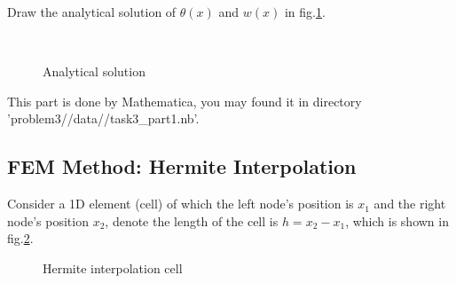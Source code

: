 Draw the analytical solution of $\theta(x)$ and $w(x)$ in fig.\ref{Analytical solution}.

\begin{figure}[H]
    \centering
    \\
    \caption{Analytical solution}
    \label{Analytical solution}
\end{figure}

This part is done by Mathematica, you may found it in directory 'problem3//data//task3\_part1.nb'.

\subsection{FEM Method: Hermite Interpolation}


Consider a 1D element (cell) of which the left node's position is $x_1$ and the right node's position $x_2$, 
denote the length of the cell is $h=x_2-x_1$, which is shown in fig.\ref{Hermite interpolation cell}.

\begin{figure}[H]
    \centering
    \caption{Hermite interpolation cell}
    \label{Hermite interpolation cell}
\end{figure}

